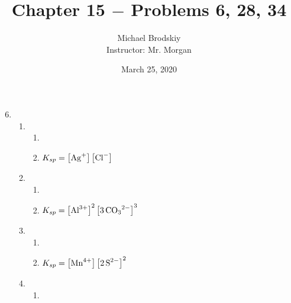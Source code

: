 \documentclass[12pt]{article}
\title{Chapter 15 $-$ Problems 6, 28, 34}
\date{March 25, 2020}
\author{Michael Brodskiy\\ \small Instructor: Mr. Morgan}
\begin{document}
\maketitle

\begin{enumerate}

    \setcounter{enumi}{5}

  \item

    \begin{enumerate}

      \item {}

        \begin{enumerate}

          \item {}

          \item $K_{sp}=\left[ \ce{Ag+} \right]\left[ \ce{Cl-} \right]$

        \end{enumerate}

      \item {}

        \begin{enumerate}

          \item {}

          \item $K_{sp}=\left[ \ce{Al^3+} \right]^2\left[ \ce{3CO3^2-} \right]^3$

        \end{enumerate}

      \item {}

        \begin{enumerate}

          \item {}

          \item $K_{sp}=\left[ \ce{Mn^4+} \right]\left[ \ce{2S^2-} \right]^2$

        \end{enumerate}

      \item {}

        \begin{enumerate}

          \item {}


\end{enumerate}
\end{enumerate}
\end{enumerate}
\end{document}
